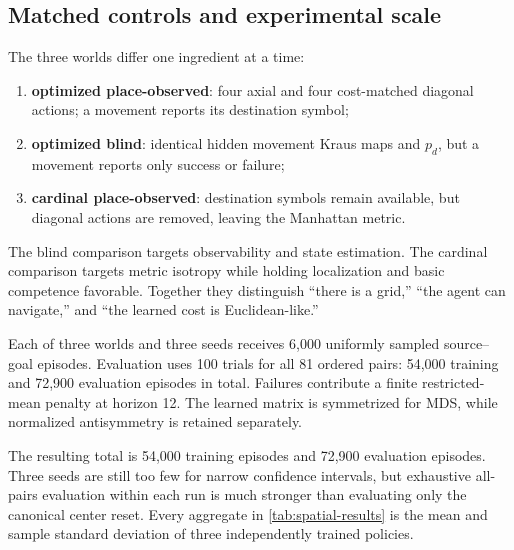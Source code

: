 \documentclass[11pt]{article}
\begin{document}
\subsection{Matched controls and experimental scale}

The three worlds differ one ingredient at a time:
\begin{enumerate}
 \item \textbf{optimized place-observed}: four axial and four cost-matched
 diagonal actions; a movement reports its destination symbol;
 \item \textbf{optimized blind}: identical hidden movement Kraus maps and
 $p_d$, but a movement reports only success or failure;
 \item \textbf{cardinal place-observed}: destination symbols remain available,
 but diagonal actions are removed, leaving the Manhattan metric.
\end{enumerate}
The blind comparison targets observability and state estimation. The cardinal
comparison targets metric isotropy while holding localization and basic
competence favorable. Together they distinguish ``there is a grid,'' ``the
agent can navigate,'' and ``the learned cost is Euclidean-like.''

Each of three worlds and three seeds receives 6,000 uniformly sampled
source--goal episodes. Evaluation uses 100 trials for all 81 ordered pairs:
54,000 training and 72,900 evaluation episodes in total. Failures contribute a
finite restricted-mean penalty at horizon 12. The learned matrix is
symmetrized for MDS, while normalized antisymmetry is retained separately.

The resulting total is 54,000 training episodes and 72,900 evaluation episodes.
Three seeds are still too few for narrow confidence intervals, but exhaustive
all-pairs evaluation within each run is much stronger than evaluating only the
canonical center reset. Every aggregate in \cref{tab:spatial-results} is the
mean and sample standard deviation of three independently trained policies.
\end{document}
